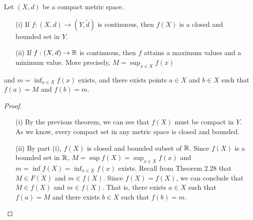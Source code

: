 \documentclass[a4paper]{article}
\begin{document}
\begin{theorem}
    Let \( (X,d) \) be a compact metric space. 
    \begin{enumerate}
        \item[(i)] If \( f: (X,d) \to (Y,\tilde{d}) \) is continuous, then \( f(X) \) is a closed and bounded set in \( Y  \). 
        \item[(ii)] If \( f: (X,d) \to \mathbb{R}   \) is continuous, then \( f  \) attains a maximum values and a minimum value. More precisely, \( M = \sup_{x \in X } f(x)  \)
    \end{enumerate} and \( m = \inf_{x \in X } f(x) \) exists, and there exists points \( a \in X  \) and \( b \in X  \) such that \( f(a) = M  \) and \( f(b) = m \).
\end{theorem}
\begin{proof}
\begin{enumerate}
    \item[(i)] By the previous theorem, we can see that \( f(X) \) must be compact in \( Y  \). As we know, every compact set in any metric space is closed and bounded. 
    \item[(ii)] By part (i), \( f(X)  \) is closed and bounded subset of \( \mathbb{R}  \). Since \( f(X) \) is a bounded set in \( \mathbb{R}  \), \( M = \sup f(X) = {\sup}_{x \in X }f(x) \) and \( m = \inf f(X) = {\inf}_{x \in X} f(x) \) exists. Recall from Theorem 2.28 that \( M \in \overline{F(X)} \) and \( m \in \overline{f(X)} \). Since \( \overline{f(X)} = f(X) \), we can conclude that \( M \in f(X) \) and \( m \in f(X) \). That is, there exists \( a \in X  \) such that \( f(a) = M  \) and there exists \( b \in X  \) such that \( f(b) = m \).
\end{enumerate}
\end{proof}
\end{document}
